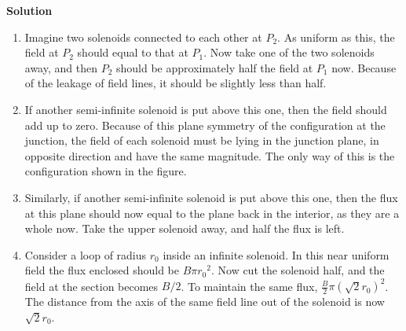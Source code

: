 \documentclass{article}
\begin{document}
\begin{homeworkProblem}
	\textbf{Solution}
	\begin{enumerate}[label=(\alph*)]
		\item Imagine two solenoids connected to each other at $P_2$. As uniform as this, the field at $P_2$ should equal to that at $P_1$. Now take one of the two solenoids away, and then $P_2$ should be approximately half the field at $P_1$ now. Because of the leakage of field lines, it should be slightly less than half.
		\item If another semi-infinite solenoid is put above this one, then the field should add up to zero. Because of this plane symmetry of the configuration at the junction, the field of each solenoid must be lying in the junction plane, in opposite direction and have the same magnitude. The only way of this is the configuration shown in the figure.
		\item Similarly, if another semi-infinite solenoid is put above this one, then the flux at this plane should now equal to the plane back in the interior, as they are a whole now. Take the upper solenoid away, and half the flux is left.
		\item Consider a loop of radius $r_0$ inside an infinite solenoid. In this near uniform field the flux enclosed should be $B\pi{r_0}^2$. Now cut the solenoid half, and the field at the section becomes $B/2$. To maintain the same flux, $\frac{B}{2}\pi\left(\sqrt{2}r_0\right)^2$. The distance from the axis of the same field line out of the solenoid is now $\sqrt{2}r_0$.
	\end{enumerate}
\end{homeworkProblem}

\end{document}
